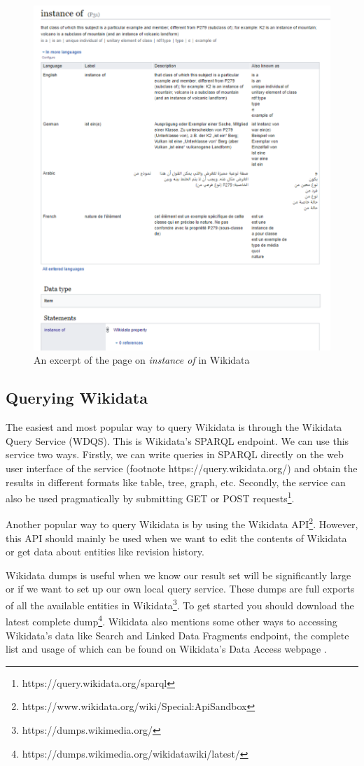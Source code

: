 \documentclass[12 pt, a4paper]{report}
\theoremstyle{definition}
\newcommand{\lukas}[1]{\todo[color=green,inline]{#1}}
\begin{document}
\begin{figure}[h]
  \centering
  \includegraphics[width=0.75 \linewidth]{images/instance_of.pdf}
  \caption{An excerpt of the page on \textit{instance of} in Wikidata}
  \label{fig:figure 4}
\end{figure}

\subsection{Querying Wikidata}

The easiest and most popular way to query Wikidata is through the Wikidata Query Service (WDQS). This is Wikidata’s SPARQL endpoint. We can use this service two ways. Firstly, we can write queries in SPARQL directly on the web user interface of the service (footnote https://query.wikidata.org/) and obtain the results in different formats like table, tree, graph, etc. Secondly, the service can also be used pragmatically \lukas{programatically(?)} by submitting GET or POST requests\footnote{https://query.wikidata.org/sparql}.

Another popular way to query Wikidata is by using the Wikidata API\footnote{https://www.wikidata.org/wiki/Special:ApiSandbox}. However, this API should mainly be used when we want to edit the contents of Wikidata or get data about entities like revision history.

Wikidata dumps is useful when we know our result set will be significantly large or if we want to set up our own local query service. These dumps are full exports of all the available entities in Wikidata\footnote{https://dumps.wikimedia.org/}. To get started you should download the latest complete dump\footnote{https://dumps.wikimedia.org/wikidatawiki/latest/}. Wikidata also mentions some other ways to accessing Wikidata’s data like Search and Linked Data Fragments endpoint, the complete list and usage of which can be found on Wikidata’s Data Access webpage \cite{ Wikidata2022}.
\end{document}
